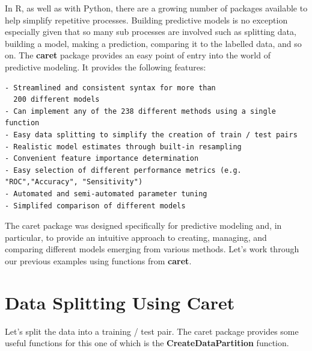 \documentclass[
]{book}
\newenvironment{Shaded}{\begin{snugshade}}{\end{snugshade}}
\newcommand{\DataTypeTok}[1]{\textcolor[rgb]{0.13,0.29,0.53}{#1}}
\newcommand{\DecValTok}[1]{\textcolor[rgb]{0.00,0.00,0.81}{#1}}
\newcommand{\KeywordTok}[1]{\textcolor[rgb]{0.13,0.29,0.53}{\textbf{#1}}}
\newcommand{\NormalTok}[1]{#1}
\newcommand{\OperatorTok}[1]{\textcolor[rgb]{0.81,0.36,0.00}{\textbf{#1}}}
\newcommand{\OtherTok}[1]{\textcolor[rgb]{0.56,0.35,0.01}{#1}}
\newcommand{\StringTok}[1]{\textcolor[rgb]{0.31,0.60,0.02}{#1}}
\begin{document}
In R, as well as with Python, there are a growing number of packages available to help simplify repetitive processes. Building predictive models is no exception especially given that so many sub processes are involved such as splitting data, building a model, making a prediction, comparing it to the labelled data, and so on. The \textbf{caret} package provides an easy point of entry into the world of predictive modeling. It provides the following features:

\begin{verbatim}
- Streamlined and consistent syntax for more than 
  200 different models
- Can implement any of the 238 different methods using a single function
- Easy data splitting to simplify the creation of train / test pairs
- Realistic model estimates through built-in resampling
- Convenient feature importance determination
- Easy selection of different performance metrics (e.g. "ROC","Accuracy", "Sensitivity")
- Automated and semi-automated parameter tuning
- Simplifed comparison of different models
\end{verbatim}

The caret package was designed specifically for predictive modeling and, in particular, to provide an intuitive approach to creating, managing, and comparing different models emerging from various methods. Let's work through our previous examples using functions from \textbf{caret}.

\hypertarget{data-splitting-using-caret}{%
\section{Data Splitting Using Caret}\label{data-splitting-using-caret}}

Let's split the data into a training / test pair. The caret package provides some useful functions for this one of which is the \textbf{CreateDataPartition} function.

\begin{Shaded}
\end{Shaded}
\end{document}
